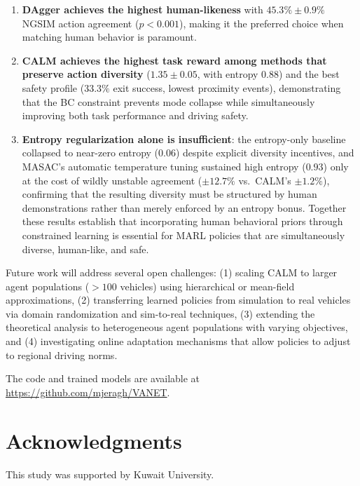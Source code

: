 \documentclass[journal]{IEEEtran}
\begin{document}
\begin{enumerate}
    \item \textbf{DAgger achieves the highest human-likeness} with $45.3\% \pm 0.9\%$ NGSIM action agreement ($p < 0.001$), making it the preferred choice when matching human behavior is paramount.

    \item \textbf{CALM achieves the highest task reward among methods that preserve action diversity} ($1.35 \pm 0.05$, with entropy $0.88$) and the best safety profile ($33.3\%$ exit success, lowest proximity events), demonstrating that the BC constraint prevents mode collapse while simultaneously improving both task performance and driving safety.

    \item \textbf{Entropy regularization alone is insufficient}: the entropy-only baseline collapsed to near-zero entropy ($0.06$) despite explicit diversity incentives, and MASAC's automatic temperature tuning sustained high entropy ($0.93$) only at the cost of wildly unstable agreement ($\pm 12.7\%$ vs.\ CALM's $\pm 1.2\%$), confirming that the resulting diversity must be structured by human demonstrations rather than merely enforced by an entropy bonus. Together these results establish that incorporating human behavioral priors through constrained learning is essential for MARL policies that are simultaneously diverse, human-like, and safe.
\end{enumerate}

Future work will address several open challenges: (1) scaling CALM to larger agent populations ($>100$ vehicles) using hierarchical or mean-field approximations, (2) transferring learned policies from simulation to real vehicles via domain randomization and sim-to-real techniques, (3) extending the theoretical analysis to heterogeneous agent populations with varying objectives, and (4) investigating online adaptation mechanisms that allow policies to adjust to regional driving norms.

The code and trained models are available at \url{https://github.com/mjeragh/VANET}.

\section*{Acknowledgments}
This study was supported by Kuwait University.



\end{document}
